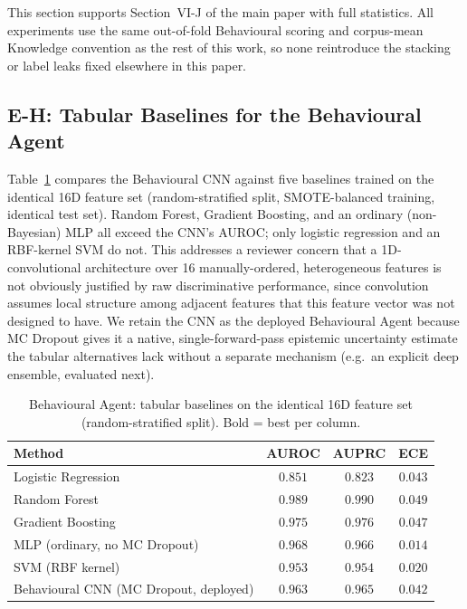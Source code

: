 \documentclass[journal]{IEEEtran}
\begin{document}
This section supports Section~VI-J of the main paper with full statistics.
All experiments use the same out-of-fold Behavioural scoring and
corpus-mean Knowledge convention as the rest of this work, so none
reintroduce the stacking or label leaks fixed elsewhere in this paper.

\subsection{E-H: Tabular Baselines for the Behavioural Agent}

Table~\ref{tab:behavioural_baselines} compares the Behavioural CNN against
five baselines trained on the identical 16D feature set (random-stratified
split, SMOTE-balanced training, identical test set). Random Forest,
Gradient Boosting, and an ordinary (non-Bayesian) MLP all exceed the CNN's
AUROC; only logistic regression and an RBF-kernel SVM do not. This
addresses a reviewer concern that a 1D-convolutional architecture over 16
manually-ordered, heterogeneous features is not obviously justified by
raw discriminative performance, since convolution assumes local structure
among adjacent features that this feature vector was not designed to have.
We retain the CNN as the deployed Behavioural Agent because MC Dropout
gives it a native, single-forward-pass epistemic uncertainty estimate the
tabular alternatives lack without a separate mechanism (e.g.\ an explicit
deep ensemble, evaluated next).

\begin{table}[h]
\centering
\footnotesize
\caption{Behavioural Agent: tabular baselines on the identical 16D feature
  set (random-stratified split). Bold = best per column.}
\label{tab:behavioural_baselines}
\setlength{\tabcolsep}{4pt}
\begin{tabular}{lccc}
\toprule
Method & AUROC & AUPRC & ECE \\
\midrule
Logistic Regression   & $0.851$ & $0.823$ & $0.043$ \\
Random Forest          & $\mathbf{0.989}$ & $\mathbf{0.990}$ & $0.049$ \\
Gradient Boosting      & $0.975$ & $0.976$ & $0.047$ \\
MLP (ordinary, no MC Dropout) & $0.968$ & $0.966$ & $\mathbf{0.014}$ \\
SVM (RBF kernel)       & $0.953$ & $0.954$ & $0.020$ \\
\midrule
Behavioural CNN (MC Dropout, deployed) & $0.963$ & $0.965$ & $0.042$ \\
\bottomrule
\end{tabular}
\end{table}
\end{document}
